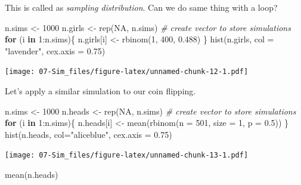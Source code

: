 \documentclass[
]{book}
\newenvironment{Shaded}{\begin{snugshade}}{\end{snugshade}}
\newcommand{\AttributeTok}[1]{\textcolor[rgb]{0.77,0.63,0.00}{#1}}
\newcommand{\CommentTok}[1]{\textcolor[rgb]{0.56,0.35,0.01}{\textit{#1}}}
\newcommand{\ConstantTok}[1]{\textcolor[rgb]{0.00,0.00,0.00}{#1}}
\newcommand{\ControlFlowTok}[1]{\textcolor[rgb]{0.13,0.29,0.53}{\textbf{#1}}}
\newcommand{\DecValTok}[1]{\textcolor[rgb]{0.00,0.00,0.81}{#1}}
\newcommand{\FloatTok}[1]{\textcolor[rgb]{0.00,0.00,0.81}{#1}}
\newcommand{\FunctionTok}[1]{\textcolor[rgb]{0.00,0.00,0.00}{#1}}
\newcommand{\NormalTok}[1]{#1}
\newcommand{\OtherTok}[1]{\textcolor[rgb]{0.56,0.35,0.01}{#1}}
\newcommand{\SpecialCharTok}[1]{\textcolor[rgb]{0.00,0.00,0.00}{#1}}
\newcommand{\StringTok}[1]{\textcolor[rgb]{0.31,0.60,0.02}{#1}}
\theoremstyle{definition}
\theoremstyle{definition}
\theoremstyle{definition}
\theoremstyle{definition}
\theoremstyle{remark}
\begin{document}
This is called as \emph{sampling distribution}. Can we do same thing with a loop?

\begin{Shaded}
\begin{Highlighting}[]
\NormalTok{n.sims }\OtherTok{\textless{}{-}} \DecValTok{1000}
\NormalTok{n.girls }\OtherTok{\textless{}{-}} \FunctionTok{rep}\NormalTok{(}\ConstantTok{NA}\NormalTok{, n.sims) }\CommentTok{\# create vector to store simulations}
\ControlFlowTok{for}\NormalTok{ (i }\ControlFlowTok{in} \DecValTok{1}\SpecialCharTok{:}\NormalTok{n.sims)\{}
\NormalTok{  n.girls[i] }\OtherTok{\textless{}{-}} \FunctionTok{rbinom}\NormalTok{(}\DecValTok{1}\NormalTok{, }\DecValTok{400}\NormalTok{, }\FloatTok{0.488}\NormalTok{)}
\NormalTok{\}}
\FunctionTok{hist}\NormalTok{(n.girls, }\AttributeTok{col =} \StringTok{"lavender"}\NormalTok{, }\AttributeTok{cex.axis =} \FloatTok{0.75}\NormalTok{)}
\end{Highlighting}
\end{Shaded}

\texttt{[image: 07-Sim\_files/figure-latex/unnamed-chunk-12-1.pdf]}

Let's apply a similar simulation to our coin flipping.

\begin{Shaded}
\begin{Highlighting}[]
\NormalTok{n.sims }\OtherTok{\textless{}{-}} \DecValTok{1000}
\NormalTok{n.heads }\OtherTok{\textless{}{-}} \FunctionTok{rep}\NormalTok{(}\ConstantTok{NA}\NormalTok{, n.sims) }\CommentTok{\# create vector to store simulations}
\ControlFlowTok{for}\NormalTok{ (i }\ControlFlowTok{in} \DecValTok{1}\SpecialCharTok{:}\NormalTok{n.sims)\{}
\NormalTok{  n.heads[i] }\OtherTok{\textless{}{-}} \FunctionTok{mean}\NormalTok{(}\FunctionTok{rbinom}\NormalTok{(}\AttributeTok{n =} \DecValTok{501}\NormalTok{, }\AttributeTok{size =} \DecValTok{1}\NormalTok{, }\AttributeTok{p =} \FloatTok{0.5}\NormalTok{))}
\NormalTok{\}}
\FunctionTok{hist}\NormalTok{(n.heads, }\AttributeTok{col=}\StringTok{"aliceblue"}\NormalTok{, }\AttributeTok{cex.axis =} \FloatTok{0.75}\NormalTok{)}
\end{Highlighting}
\end{Shaded}

\texttt{[image: 07-Sim\_files/figure-latex/unnamed-chunk-13-1.pdf]}

\begin{Shaded}
\begin{Highlighting}[]
\FunctionTok{mean}\NormalTok{(n.heads)}
\end{Highlighting}
\end{Shaded}
\end{document}

